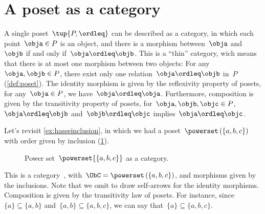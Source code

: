 

\section{A poset as a category}
\label{sec:posetsarecats}
A single poset~$\tup{P, \ordleq}$ can be described as a category, in which each point~$\obja\in P$ is an object, and there is a morphism between~$\obja$ and~$\objb$ if and only if~$\obja \ordleq \objb$. This is a ``thin'' category, wich means that there is at most one morphism
between two objects: For any~$\obja,\objb\in P$, there exist only one relation~$\obja\ordleq \objb$ in~$P$ (\cref{def:poset}). The identity morphism is given by the reflexivity property of posets, \ie  for any~$\obja\in P$, we have~$\obja \ordleq \obja$. Furthermore, composition is given by the transitivity property of posets, \ie  for~$\obja,\objb,\objc \in P$,~$\obja\ordleq \objb$ and~$\objb\ordleq \objc$ implies~$\obja\ordleq \objc$.

\begin{example}
  Let's revisit \cref{ex:hasseinclusion}, in which we had a poset~$\powerset\left(\{a,b,c\}\right)$ with order given by inclusion (\cref{fig:posetascat}).

  \begin{figure}[h!]
    \begin{center}
    \end{center}
    \caption{Power set~$\powerset{\{a,b,c\}}$ as a category. \label{fig:posetascat}}
  \end{figure}

  This is a category~\CatC, with~$\ObC=\powerset\left(\{a,b,c\}\right)$, and morphisms given by the inclusions. Note that we omit to draw self-arrows for the identity morphisms. Composition is given by the transitivity law of posets. For instance, since~$\{a\}\subseteq \{a,b\}$ and~$\{a,b\} \subseteq \{a,b,c\}$, we can say that~$\{a\}\subseteq \{a,b,c\}$.
\end{example}

